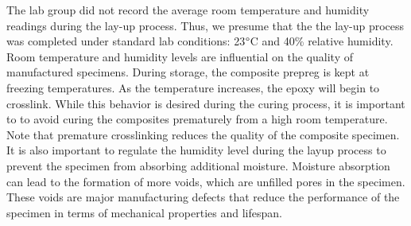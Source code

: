 
The lab group did not record the average room temperature and humidity readings during the lay-up process. Thus, we presume that the the lay-up process was completed under standard lab conditions: 23$\degree$C and 40\% relative humidity. Room temperature and humidity levels are influential on the quality of manufactured specimens. During storage, the composite prepreg is kept at freezing temperatures. As the temperature increases, the epoxy will begin to crosslink. While this behavior is desired during the curing process, it is important to to avoid curing the composites prematurely from a high room temperature. Note that premature crosslinking reduces the quality of the composite specimen. It is also important to regulate the humidity level during the layup process to prevent the specimen from absorbing additional moisture. Moisture absorption can lead to the formation of more voids, which are unfilled pores in the specimen. These voids are major manufacturing defects that reduce the performance of the specimen in terms of mechanical properties and lifespan.